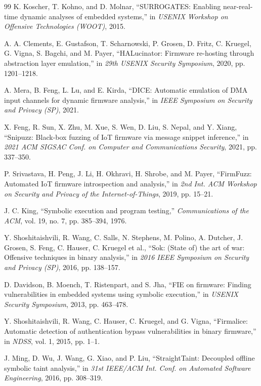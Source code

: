 \begin{thebibliography}{99}
K. Koscher, T. Kohno, and D. Molnar, ``SURROGATES: Enabling near-real-time dynamic analyses of embedded systems,'' in \textit{USENIX Workshop on Offensive Technologies (WOOT)}, 2015.

A. A. Clements, E. Gustafson, T. Scharnowski, P. Grosen, D. Fritz, C. Kruegel, G. Vigna, S. Bagchi, and M. Payer, ``HALucinator: Firmware re-hosting through abstraction layer emulation,'' in \textit{29th USENIX Security Symposium}, 2020, pp. 1201--1218.

A. Mera, B. Feng, L. Lu, and E. Kirda, ``DICE: Automatic emulation of DMA input channels for dynamic firmware analysis,'' in \textit{IEEE Symposium on Security and Privacy (SP)}, 2021.

X. Feng, R. Sun, X. Zhu, M. Xue, S. Wen, D. Liu, S. Nepal, and Y. Xiang, ``Snipuzz: Black-box fuzzing of IoT firmware via message snippet inference,'' in \textit{2021 ACM SIGSAC Conf. on Computer and Communications Security}, 2021, pp. 337--350.

P. Srivastava, H. Peng, J. Li, H. Okhravi, H. Shrobe, and M. Payer, ``FirmFuzz: Automated IoT firmware introspection and analysis,'' in \textit{2nd Int. ACM Workshop on Security and Privacy of the Internet-of-Things}, 2019, pp. 15--21.

J. C. King, ``Symbolic execution and program testing,'' \textit{Communications of the ACM}, vol. 19, no. 7, pp. 385--394, 1976.

Y. Shoshitaishvili, R. Wang, C. Salls, N. Stephens, M. Polino, A. Dutcher, J. Grosen, S. Feng, C. Hauser, C. Kruegel et al., ``Sok: (State of) the art of war: Offensive techniques in binary analysis,'' in \textit{2016 IEEE Symposium on Security and Privacy (SP)}, 2016, pp. 138--157.

D. Davidson, B. Moench, T. Ristenpart, and S. Jha, ``FIE on firmware: Finding vulnerabilities in embedded systems using symbolic execution,'' in \textit{USENIX Security Symposium}, 2013, pp. 463--478.

Y. Shoshitaishvili, R. Wang, C. Hauser, C. Kruegel, and G. Vigna, ``Firmalice: Automatic detection of authentication bypass vulnerabilities in binary firmware,'' in \textit{NDSS}, vol. 1, 2015, pp. 1--1.

J. Ming, D. Wu, J. Wang, G. Xiao, and P. Liu, ``StraightTaint: Decoupled offline symbolic taint analysis,'' in \textit{31st IEEE/ACM Int. Conf. on Automated Software Engineering}, 2016, pp. 308--319.


\end{thebibliography}
